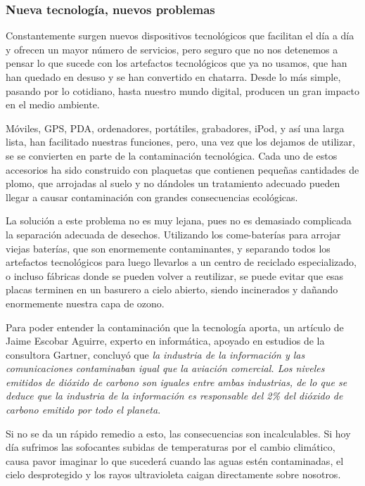 \subsubsection{Nueva tecnología, nuevos problemas}

Constantemente surgen nuevos dispositivos tecnológicos que facilitan el día a
día y ofrecen un mayor número de servicios, pero seguro que no nos detenemos a
pensar lo que sucede con los artefactos tecnológicos que ya no usamos, que han
han quedado en desuso y se han convertido en chatarra. Desde lo más simple, pasando por
lo cotidiano, hasta nuestro mundo digital, producen un gran impacto en el medio
ambiente.

Móviles, GPS, PDA, ordenadores, portátiles, grabadores, iPod, y así una larga
lista, han facilitado nuestras funciones, pero, una vez que los dejamos de utilizar, se
se convierten en parte de la contaminación tecnológica. Cada uno de estos accesorios ha
sido construido con plaquetas que contienen pequeñas cantidades de plomo, que
arrojadas al suelo y no dándoles un tratamiento adecuado pueden llegar a causar
contaminación con grandes consecuencias ecológicas.

La solución a este problema no es muy lejana, pues no es demasiado complicada la separación adecuada de
desechos. Utilizando los come-baterías para arrojar viejas baterías, que son
enormemente contaminantes, y separando todos los artefactos tecnológicos para luego
llevarlos a un centro de reciclado especializado, o incluso fábricas donde se pueden
volver a reutilizar, se puede evitar que esas placas terminen en un basurero a cielo
abierto, siendo incinerados y dañando enormemente nuestra capa de ozono.

Para poder entender la contaminación que la tecnología aporta, un artículo
de Jaime Escobar Aguirre, experto en informática, apoyado en estudios de la consultora
Gartner, concluyó que \emph{la industria de la información y las comunicaciones
	contaminaban igual que la aviación comercial. Los niveles emitidos de dióxido de
	carbono son iguales entre ambas industrias, de lo que se deduce que la industria de la
	información es responsable del 2\% del dióxido de carbono emitido por todo el planeta}.

Si no se da un rápido remedio a esto, las consecuencias son incalculables. Si
hoy día sufrimos las sofocantes subidas de temperaturas por el cambio climático, causa
pavor imaginar lo que sucederá cuando las aguas estén contaminadas, el cielo
desprotegido y los rayos ultravioleta caigan directamente sobre nosotros.

